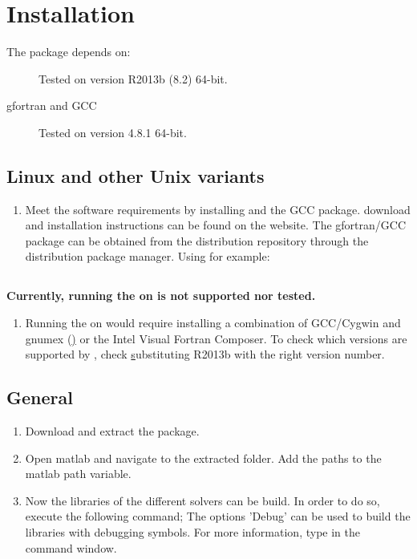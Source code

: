 \chapter[Installation]{Installation} \label{ch:Installation}
The \PPODESUITE package depends on:
\begin{description}
  \item[\MATLAB] Tested on \MATLAB version R2013b (8.2) 64-bit.
  \item[gfortran and GCC] Tested on version 4.8.1 64-bit.
\end{description}

\section[\nix]{Linux and other Unix variants}
\begin{enumerate}
 \item Meet the software requirements by installing \MATLAB and the GCC package. \MATLAB download and installation instructions can be found on the \MATHWORKS website. The gfortran/GCC package can be obtained from the \nix distribution repository through the distribution package manager. Using \UBUNTU for example:
\end{enumerate}

\section[Windows]{\MSDOS}
\textbf{Currently, running the \PPODESUITE on \MSDOS is not supported nor tested.}
\begin{enumerate}
 \item Running the \PPODESUITE on \MSDOS would require installing a combination of GCC/Cygwin and gnumex (\hyperlink{http://gnumex.sourceforge.net/}) or the Intel Visual Fortran Composer. To check which versions are supported by \MATLAB, check \hyperlink{http://www.mathworks.nl/support/compilers/R2013b/} substituting R2013b with the right version number.
\end{enumerate}

\section{General}
\begin{enumerate}[resume]
 \item Download and extract the \PPODESUITE package.
 \item Open matlab and navigate to the extracted \PPODESUITE folder. Add the \PPODE paths to the matlab path variable.
 \item Now the libraries of the different solvers can be build. In order to do so, execute the following command;
 The options 'Debug' can be used to build the libraries with debugging symbols.
 For more information, type  in the \MATLAB command window.
\end{enumerate}
